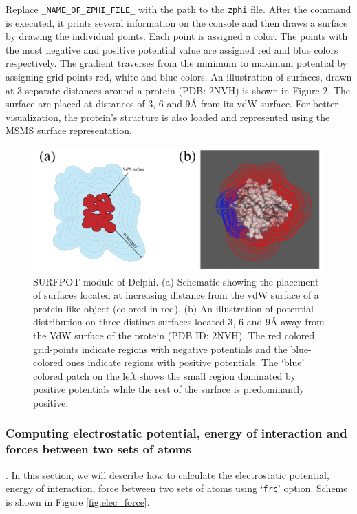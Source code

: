 \documentclass[9pt,tutorial]{livecoms}
\begin{document}
Replace \texttt{\_NAME\_OF\_ZPHI\_FILE\_} with the path to the \texttt{zphi} file. After the command is executed, it prints several information on the console and then draws a surface by drawing the individual points. Each point is assigned a color. The points with the most negative and positive potential value are assigned red and blue colors respectively. The gradient traverses from the minimum to maximum potential by assigning grid-points red, white and blue colors. An illustration of surfaces, drawn at 3 separate distances around a protein (PDB: 2NVH) is shown in Figure 2. The surface are placed at distances of 3, 6 and 9Å from its vdW surface. For better visualization, the protein’s structure is also loaded and represented using the MSMS surface representation. 

\begin{figure}
\includegraphics[width=0.95\linewidth]{Figure_9.png}
\caption{SURFPOT module of Delphi. (a) Schematic showing the placement of surfaces located at increasing distance from the vdW surface of a protein like object (colored in red). (b) An illustration of potential distribution on three distinct surfaces located 3, 6 and 9Å away from the VdW surface of the protein (PDB ID: 2NVH). The red colored grid-points indicate regions with negative potentials and the blue-colored ones indicate regions with positive potentials. The ‘blue’ colored patch on the left shows the small region dominated by positive potentials while the rest of the surface is predominantly positive.}
\label{fig:grid-scheme-representation}
\end{figure}


\subsubsection{Computing electrostatic potential, energy of interaction and forces between two sets of atoms}. In this section, we will describe how to calculate the electrostatic potential, energy of interaction, force between two sets of atoms using ‘\texttt{frc}’ option. Scheme is shown in Figure \ref{fig:elec_force}.
\end{document}
